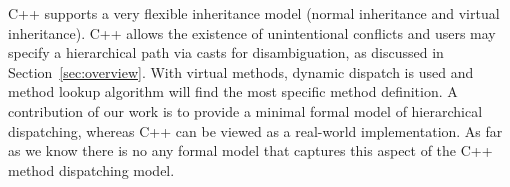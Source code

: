 \begin{comment} %
\noindent {\bf C++ model.}
C++ supports a very flexible inheritance model and allows programmers to choose either static dispatch or dynamic dispatch for method lookup.
It allows unintentional conflicts and uses static dispatch to resolve them, as discussed in Section~\ref{sec:overview}. For example, given the following code
\begin{lstlisting}[language=Java]
class A { public: void m() {cout << "MA" << endl;} };
class B { public: void m() {cout << "MB" << endl;} };
class C : public A, public B { 
	void m() {cout << "MC" << endl;}
};
void func(A* a) { a->m(); }
int main() {
	C* c = new C();
	c->B::m();
	func(c); 
	return 0; //Running result: MB MA
}
\end{lstlisting}
The running result is $MB \; MA$, meaning that it uses static dispatch (looks at the static types) for method \lstinline|m()|. 
On calling \texttt{func(c)}, in spite that the dynamic type of \texttt{c} is class \texttt{C}, the method call still dispatches to 
\lstinline|A.m|.
However, we can alter the code a little bit with \textbf{\texttt{virtual}} methods and the result will be totally different:
\begin{lstlisting}[language=c++]
class A { public: virtual void m() {cout << "MA" << endl;} };
class B { public: virtual void m() {cout << "MB" << endl;} };
class C : public A, public B { 
    public: virtual void m() {cout << "MC" << endl;}
};
void func(A* a) { a->m(); }
int main() {
	C* c = new C();
	c->B::m();
	func(c); 
	return 0; //Running result: MB MC
}
\end{lstlisting}
Now the running result will be $MB \; MC$. With virtual methods, dynamic dispatch is used and 
method lookup algorithm will find the most specific method definition of $m$, namely \lstinline|C.m| at this time.
Although C++ support this flexibility, dynamic dispatching on
unintentional conflicting methods is problematic, as discussed in
Section~\ref{sec:overview}.\bruno{where in the overview are we
  discussing this?}
Furthermore, compared to our
model, C++ does not support hierarchical overriding.
\end{comment}



C++ supports a very flexible inheritance model (normal inheritance and
virtual inheritance). 
C++ allows the existence of unintentional conflicts and users may specify a hierarchical path via casts for disambiguation, as discussed in Section~\ref{sec:overview}. 
With virtual methods, dynamic dispatch is used and 
method lookup algorithm will find the most specific method definition.
A contribution of our work is to provide a minimal formal model of
hierarchical dispatching, whereas C++ can be viewed as a real-world
implementation. As far as we know there is no any formal model that
captures this aspect of the C++ method dispatching model. 

